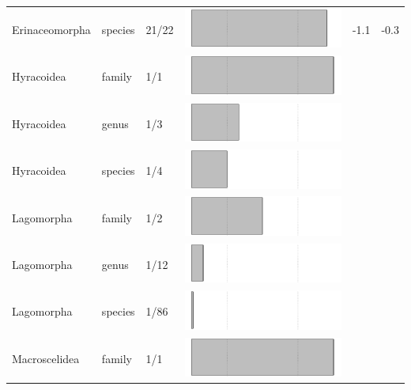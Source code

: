 \begin{longtable}{lL{1.8cm}C{2cm}ccc}
  Erinaceomorpha & species & 21/22 & \includegraphics[width=0.20\linewidth, height=0.05\linewidth]{Missing_mammals/Table_figures/bar30.pdf} & -1.1 & -0.3 \\ 
  Hyracoidea & family & 1/1 & \includegraphics[width=0.20\linewidth, height=0.05\linewidth]{Missing_mammals/Table_figures/bar31.pdf} &   &   \\ 
  Hyracoidea & genus & 1/3 & \includegraphics[width=0.20\linewidth, height=0.05\linewidth]{Missing_mammals/Table_figures/bar32.pdf} &   &   \\ 
  Hyracoidea & species & 1/4 & \includegraphics[width=0.20\linewidth, height=0.05\linewidth]{Missing_mammals/Table_figures/bar33.pdf} &   &   \\ 
  Lagomorpha & family & 1/2 & \includegraphics[width=0.20\linewidth, height=0.05\linewidth]{Missing_mammals/Table_figures/bar34.pdf} &   &   \\ 
  Lagomorpha & genus & 1/12 & \includegraphics[width=0.20\linewidth, height=0.05\linewidth]{Missing_mammals/Table_figures/bar35.pdf} &   &   \\ 
  Lagomorpha & species & 1/86 & \includegraphics[width=0.20\linewidth, height=0.05\linewidth]{Missing_mammals/Table_figures/bar36.pdf} &   &   \\ 
  Macroscelidea & family & 1/1 & \includegraphics[width=0.20\linewidth, height=0.05\linewidth]{Missing_mammals/Table_figures/bar37.pdf} &   &   \\ 

\end{longtable}
